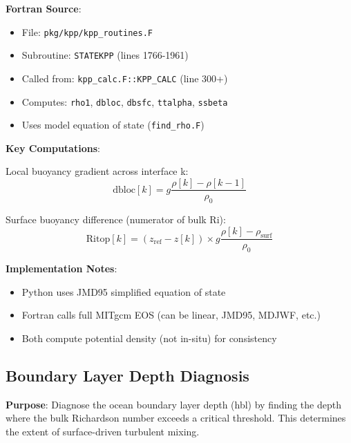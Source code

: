 \documentclass[11pt]{article}
\begin{document}
\textbf{Fortran Source}:
\begin{itemize}
    \item File: \verb|pkg/kpp/kpp_routines.F|
    \item Subroutine: \verb|STATEKPP| (lines 1766-1961)
    \item Called from: \verb|kpp_calc.F::KPP_CALC| (line 300+)
    \item Computes: \verb|rho1|, \verb|dbloc|, \verb|dbsfc|, \verb|ttalpha|, \verb|ssbeta|
    \item Uses model equation of state (\verb|find_rho.F|)
\end{itemize}

\textbf{Key Computations}:

Local buoyancy gradient across interface k:
\begin{equation}
\text{dbloc}[k] = g \frac{\rho[k] - \rho[k-1]}{\rho_0}
\end{equation}

Surface buoyancy difference (numerator of bulk Ri):
\begin{equation}
\text{Ritop}[k] = (z_{\text{ref}} - z[k]) \times g \frac{\rho[k] - \rho_{\text{surf}}}{\rho_0}
\end{equation}

\textbf{Implementation Notes}:
\begin{itemize}
    \item Python uses JMD95 simplified equation of state
    \item Fortran calls full MITgcm EOS (can be linear, JMD95, MDJWF, etc.)
    \item Both compute potential density (not in-situ) for consistency
\end{itemize}

\subsection{Boundary Layer Depth Diagnosis}

\textbf{Purpose}: Diagnose the ocean boundary layer depth (hbl) by finding the depth where the bulk Richardson number exceeds a critical threshold. This determines the extent of surface-driven turbulent mixing.
\end{document}
